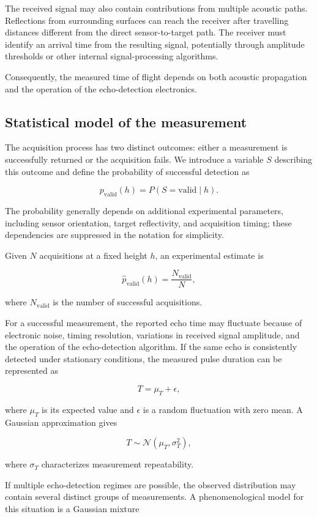 \documentclass[11pt,a4paper]{article}
\begin{document}
The received signal may also contain contributions from multiple acoustic paths. Reflections from surrounding surfaces can reach the receiver after travelling distances different from the direct sensor-to-target path. The receiver must identify an arrival time from the resulting signal, potentially through amplitude thresholds or other internal signal-processing algorithms.

Consequently, the measured time of flight depends on both acoustic propagation and the operation of the echo-detection electronics.
\subsection{Statistical model of the measurement}
\label{sec:org764bb9d}
The acquisition process has two distinct outcomes: either a measurement is successfully returned or the acquisition fails. We introduce a variable \(S\) describing this outcome and define the probability of successful detection as

\[
p_{\mathrm{valid}}(h)=P(S=\mathrm{valid}\mid h).
\]

The probability generally depends on additional experimental parameters, including sensor orientation, target reflectivity, and acquisition timing; these dependencies are suppressed in the notation for simplicity.

Given \(N\) acquisitions at a fixed height \(h\), an experimental estimate is

\[
\hat p_{\mathrm{valid}}(h)=\frac{N_{\mathrm{valid}}}{N},
\]

where \(N_{\mathrm{valid}}\) is the number of successful acquisitions.

For a successful measurement, the reported echo time may fluctuate because of electronic noise, timing resolution, variations in received signal amplitude, and the operation of the echo-detection algorithm. If the same echo is consistently detected under stationary conditions, the measured pulse duration can be represented as

\[
T=\mu_T+\epsilon,
\]

where \(\mu_T\) is its expected value and \(\epsilon\) is a random fluctuation with zero mean. A Gaussian approximation gives

\[
T\sim\mathcal N(\mu_T,\sigma_T^2),
\]

where \(\sigma_T\) characterizes measurement repeatability.

If multiple echo-detection regimes are possible, the observed distribution may contain several distinct groups of measurements.  A phenomenological model for this situation is a Gaussian mixture
\end{document}
